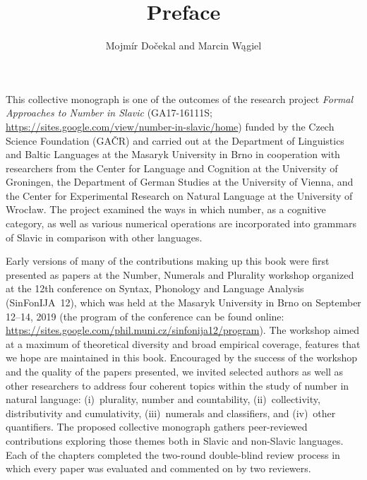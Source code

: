 \documentclass{langscibook}
\author{Mojmír Dočekal\affiliation{Masaryk University} and Marcin Wągiel\affiliation{Masaryk University}}
\title{Preface}
\begin{document}
\maketitle

\noindent This collective monograph is one of the outcomes of the research project \textit{Formal Approaches to Number in Slavic} (GA17-16111S; \url{https://sites.google.com/view/number-in-slavic/home}) funded by the Czech Science Foundation (GAČR) and carried out at the Department of Linguistics and Baltic Languages at the Masaryk University in Brno in cooperation with researchers from the Center for Language and Cognition at the University of Groningen, the Department of German Studies at the University of Vienna, and the Center for Experimental Research on Natural Language at the University of Wrocław. The project examined the ways in which number, as a cognitive category, as well as various numerical operations are incorporated into grammars of Slavic in comparison with other languages.

Early versions of many of the contributions making up this book were first presented as papers at the Number, Numerals and Plurality workshop organized at the 12th conference on Syntax, Phonology and Language Analysis (SinFonIJA~12), which was held at the Masaryk University in Brno on September 12--14, 2019 (the program of the conference can be found online: \url{https://sites.google.com/phil.muni.cz/sinfonija12/program}). The workshop aimed at a maximum of theoretical diversity and broad empirical coverage, features that we hope are maintained in this book. Encouraged by the success of the workshop and the quality of the papers presented, we invited selected authors as well as other researchers to address four coherent topics within the study of number in natural language: (i)~plurality, number and countability, (ii)~collectivity, distributivity and cumulativity, (iii)~numerals and classifiers, and (iv)~other quantifiers. The proposed collective monograph gathers peer-reviewed contributions exploring those themes both in Slavic and non-Slavic languages. Each of the chapters completed the two-round double-blind review process in which every paper was evaluated and commented on by two reviewers.
\end{document}
